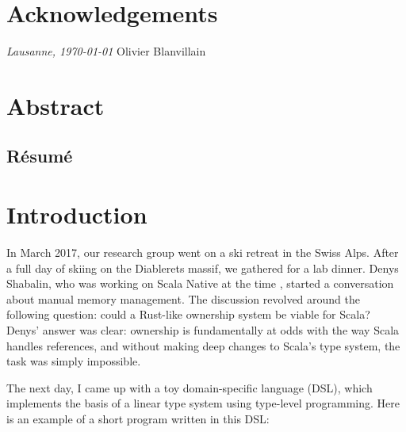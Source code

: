 



\frontmatter

\setcounter{page}{0}

\chapter{Acknowledgements}
\lipsum[1-2]

\bigskip
\noindent\textit{Lausanne, \today}
\hfill Olivier Blanvillain

\cleardoublepage
\chapter*{Abstract}
\lipsum[1-2] %
\begin{otherlanguage}{french}
\cleardoublepage
\chapter*{Résumé}
\lipsum[1-2]
\end{otherlanguage}

\tableofcontents

\cleardoublepage
{}
{}
\listoffigures
\mainmatter


\chapter{Introduction}
\label{chap:introduction}

In March 2017, our research group went on a ski retreat in the Swiss Alps.
After a full day of skiing on the Diablerets massif, we gathered for a lab dinner.
Denys Shabalin, who was working on Scala Native at the time \citep{shabalin2020just}, started a conversation about manual memory management.
The discussion revolved around the following question: could a Rust-like ownership system be viable for Scala?
Denys' answer was clear: ownership is fundamentally at odds with the way Scala handles references, and without making deep changes to Scala's type system, the task was simply impossible.

The next day, I came up with a toy domain-specific language (DSL), which implements the basis of a linear type system using type-level programming.
Here is an example of a short program written in this DSL:

